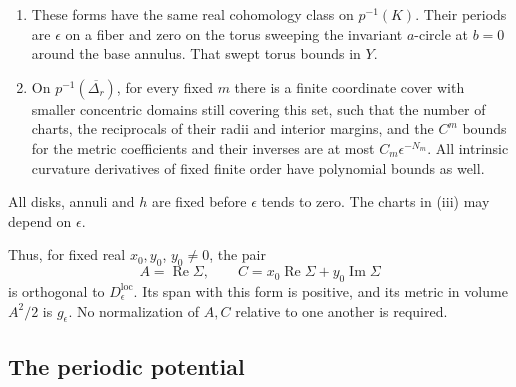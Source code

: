 \begin{theorem}
\begin{enumerate}[label=\textup{(\roman*)}]
\item These forms have the same real cohomology class on \(p^{-1}(K)\).
Their periods are \(\epsilon\) on a fiber and zero on the torus
sweeping the invariant \(a\)-circle at \(b=0\) around the base annulus.
That swept torus bounds in \(Y\).
\item On \(p^{-1}(\overline{\Delta_r})\), for every fixed \(m\) there
is a finite coordinate cover with smaller concentric domains still
covering this set, such that the number of charts, the reciprocals
of their radii and interior margins, and the \(C^m\) bounds for
the metric coefficients and their inverses are at most
\(C_m\epsilon^{-N_m}\).  All intrinsic curvature derivatives of
fixed finite order have polynomial bounds as well.
\end{enumerate}
All disks, annuli and \(h\) are fixed before \(\epsilon\) tends to zero.
The charts in \textup{(iii)} may depend on \(\epsilon\).
\end{theorem}

Thus, for fixed real \(x_0,y_0\), \(y_0\ne0\), the pair
\[
 A=\operatorname{Re}\Sigma,\qquad
 C=x_0\operatorname{Re}\Sigma+y_0\operatorname{Im}\Sigma
\]
is orthogonal to \(D^{\mathrm{loc}}_\epsilon\).  Its span with this
form is positive, and its metric in volume \(A^2/2\) is \(g_\epsilon\).
No normalization of \(A,C\) relative to one another is required.

\subsection{The periodic potential}

